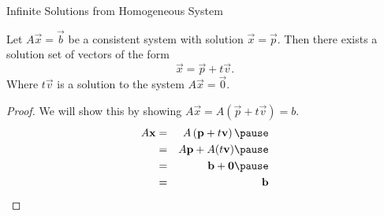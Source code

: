 \documentclass[xcoler=dvipsnames, aspectratio=169]{beamer}
\begin{document}
    \begin{frame}{Infinite Solutions from Homogeneous System}
        \small
        \begin{theorem}
            Let $A\vec{x}=\vec{b}$ be a consistent system with solution $\vec{x}=\vec{p}$. Then
            there exists a solution set of vectors of the form
            \[
                \vec{x} = \vec{p} + t\vec{v}.
            \]
            Where $t\vec{v}$ is a solution to the  system $A\vec{x} = \vec{0}$.
        \end{theorem}
        \pause
        \begin{proof}
            We will show this by showing $A\vec{x} = A\left(\vec{p} + t\vec{v}\right) = b$.
            \pause
            \begin{eqnarray*}
                A\vec{x} &=& A\left(\vec{p} + t\vec{v}\right)\pause \\ 
                &=& A\vec{p} + A(t\vec{v})\pause \\
                &=& \vec{b} + \vec{0}\pause\\
                &=& \vec{b}
            \end{eqnarray*}
        \end{proof}
    \end{frame}
\end{document}
